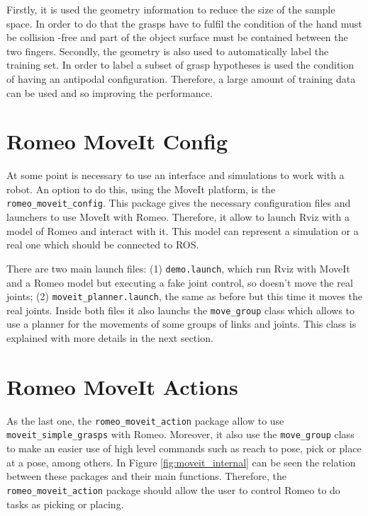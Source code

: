 \documentclass[12pt,a4paper,final,twoside,openright]{report}
\begin{document}
Firstly, it is used the geometry information to reduce the size of the sample space. In order to do that the grasps have to fulfil the condition of the hand must be collision -free and part of the object surface must be contained between the two fingers. Secondly, the geometry is also used to automatically label the training set. In order to label a subset of grasp hypotheses is used the condition of having an antipodal configuration. Therefore, a large amount of training data can be used and so improving the performance.

\section{Romeo MoveIt Config}
\label{sec:romeo_moveit_config}

At some point is necessary to use an interface and simulations to work with a robot. An option to do this, using the MoveIt platform, is the \texttt{romeo\_moveit\_config}. This package gives the necessary configuration files and launchers to use MoveIt with Romeo. Therefore, it allow to launch Rviz with a model of Romeo and interact with it. This model can represent a simulation or a real one which should be connected to ROS.

There are two main launch files: (1) \texttt{demo.launch}, which run Rviz with MoveIt and a Romeo model but executing a fake joint control, so doesn't move the real joints; (2) \texttt{moveit\_planner.launch}, the same as before but this time it moves the real joints. Inside both files it also launchs the \texttt{move\_group} class which allows to use a planner for the movements of some groups of links and joints. This class is explained with more details in the next section.

\section{Romeo MoveIt Actions}
\label{sec:romeo_moveit_actions}

As the last one, the \texttt{romeo\_moveit\_action} package allow to use \texttt{moveit\_simple\_grasps} with Romeo. Moreover, it also use the \texttt{move\_group} class to make an easier use of high level commands such as reach to pose, pick or place at a pose, among others. In Figure \ref{fig:moveit_internal} can be seen the relation between these packages and their main functions. Therefore, the \texttt{romeo\_moveit\_action} package should allow the user to control Romeo to do tasks as picking or placing.
\end{document}
